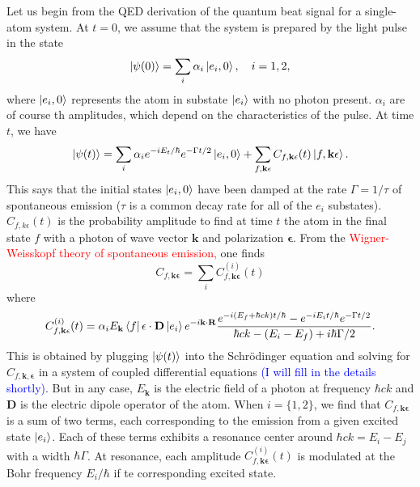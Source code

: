 \documentclass[11pt]{article}
\newcommand{\al}{\alpha}
\newcommand{\f}[2]{\frac{#1}{#2}}
\begin{document}
\begin{appendices}
Let us begin from the QED derivation of the quantum beat signal for a single-atom system. At $t=0$, we assume that the system is prepared by the light pulse in the state
\begin{equation*}
\ket{\psi(0)} = \sum_i \al_i \ket{e_i,0}, \quad i = 1,2,
\end{equation*}
where $\ket{e_i,0}$ represents the atom in substate $\ket{e_i}$ with no photon present. $\al_i$ are of course th amplitudes, which depend on the characteristics of the pulse. At time $t$, we have
\begin{equation*}
\ket{\psi(t)} = \sum_i \al_i e^{-i E_t/\hbar} e^{-\Gamma t/2} \ket{e_i,0} + \sum_{f,\mathbf{k\epsilon}} C_{f,\mathbf{k\epsilon}}(t)\ket{f,\mathbf{k\epsilon}}.
\end{equation*}
This says that the initial states $\ket{e_i,0}$ have been damped at the rate $\Gamma = 1/\tau$ of spontaneous emission ($\tau$ is a common decay rate for all of the $e_i$ substates). $C_{f,k\epsilon}(t)$ is the probability amplitude to find at time $t$ the atom in the final state $f$ with a photon of wave vector $\mathbf{k}$ and polarization $\mathbf{\epsilon}$.  From the \textcolor{red}{Wigner-Weisskopf theory of spontaneous emission,} one finds
\begin{equation*}
C_{f,\mathbf{k\epsilon}} = \sum_i C_{f,\mathbf{k\epsilon}}^{(i)} (t)
\end{equation*}
where
\begin{equation}\label{eq:WignerWeisskopf}
C_{f,\mathbf{k\epsilon}}^{(i)} (t) = \al_i E_\mathbf{k} \bra{f} \mathbf{\epsilon}\cdot \mathbf{D} \ket{e_i} e^{-i\mathbf{k}\cdot \mathbf{R}} \f{e^{-i(E_f + \hbar c k)t/\hbar}  -e^{-iE_i t/\hbar}e^{-\Gamma t / 2}  }{\hbar c k - (E_i - E_f) + i\hbar \Gamma/2}.
\end{equation}
This is obtained by plugging $\ket{\psi(t)}$ into the Schr\"{o}dinger equation and solving for $C_{f,\mathbf{k,\epsilon}}$ in a system of coupled differential equations \textcolor{blue}{(I will fill in the details shortly)}. But in any case, $E_\mathbf{k}$ is the electric field of a photon at frequency $\hbar c k$ and $\mathbf{D}$ is the electric dipole operator of the atom. When $i = \{1,2\}$, we find that $C_{f, \mathbf{k\epsilon}}$ is a sum of two terms, each corresponding to the emission from a given excited state $\ket{e_i}$. Each of these terms exhibits a resonance center around $\hbar c k = E_i - E_j$ with a width $\hbar \Gamma$. At resonance, each amplitude $C_{f,\mathbf{k\epsilon}}^{(i)} (t)$ is modulated at the Bohr frequency $E_i/\hbar$ if te corresponding excited state. 


\end{appendices}
\end{document}
